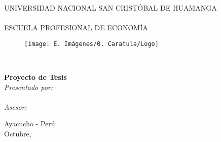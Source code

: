 \begin{titlepage}
	
	\begin{center}
		\vspace*{\baselineskip}
        {
		{\normalsize  \textrm{UNIVERSIDAD NACIONAL SAN CRISTÓBAL DE HUAMANGA}}\\
		\vspace{5 mm}
		{\small \textrm{\@facultad}}\\
		\vspace{5 mm}
		{\large \textrm{ESCUELA PROFESIONAL DE ECONOMÍA}}\\
		}
		\vspace*{0.5\baselineskip}
		
		\begin{figure}[h]
			\centering 
			{\texttt{[image: E. Imágenes/0. Caratula/Logo]}\par}
		\end{figure}
		
		\vspace{1 mm}	

		\onehalfspacing  %
		{\Large \textbf{\@titlecaratula}}\\
		
		\singlespacing  %
		
		\vspace{5 mm}
		{\large \textbf{Proyecto de Tesis} }\\
		\vspace{5 mm}	
		{\large \textsl{Presentado por:} }\\
		\vspace{5 mm}	
		{\Large{\@authorcaratula}}\\
		\vspace{10 mm}
		{\large \textsl{Asesor:} } {\large \textsl{\@asesor}}\\
		
		\vfill	
		
		{\large{Ayacucho - Perú} }\\
		\vspace{5 mm}	
		{\large{Octubre, \@yyearr} }\\

	\end{center}

\end{titlepage}